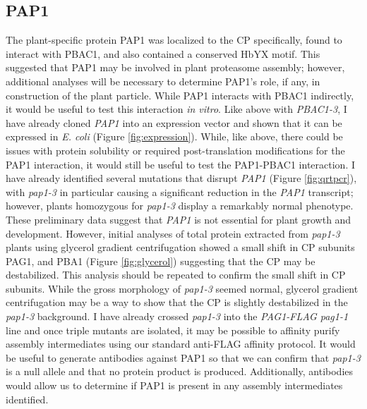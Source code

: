 \subsection{PAP1}
The plant-specific protein PAP1 was localized to the CP specifically, found to interact with PBAC1, and also contained a conserved HbYX motif. This suggested that PAP1 may be involved in plant proteasome assembly; however, additional analyses will be necessary to determine PAP1's role, if any, in construction of the plant particle.  While PAP1 interacts with PBAC1 indirectly, it would be useful to test this interaction \textit{in vitro}. Like above with \textit{PBAC1-3}, I have already cloned \textit{PAP1} into an expression vector and shown that it can be expressed in \textit{E. coli} (Figure \ref{fig:expression}). While, like above, there could be issues with protein solubility or required post-translation modifications for the PAP1 interaction, it would still be useful to test the PAP1-PBAC1 interaction.  I have already identified several mutations that disrupt \textit{PAP1} (Figure \ref{fig:qrtpcr}), with \textit{pap1-3} in particular causing a significant reduction in the \textit{PAP1} transcript; however, plants homozygous for \textit{pap1-3} display a remarkably normal phenotype.  These preliminary data suggest that \textit{PAP1} is not essential for plant growth and development. However, initial analyses of total protein extracted from \textit{pap1-3} plants using glycerol gradient centrifugation showed a small shift in CP subunits PAG1, and PBA1 (Figure \ref{fig:glycerol}) suggesting that the CP may be destabilized. This analysis should be repeated to confirm the small shift in CP subunits. While the gross morphology of \textit{pap1-3} seemed normal, glycerol gradient centrifugation may be a way to show that the CP is slightly destabilized in the \textit{pap1-3} background. I have already crossed \textit{pap1-3} into the \textit{PAG1-FLAG pag1-1} line and once triple mutants are isolated, it may be possible to affinity purify assembly intermediates using our standard anti-FLAG affinity protocol. It would be useful to generate antibodies against PAP1 so that we can confirm that \textit{pap1-3} is a null allele and that no protein product is produced. Additionally, antibodies would allow us to determine if PAP1 is present in any assembly intermediates identified.

